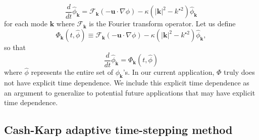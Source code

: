 \documentclass[12pt]{article}
\begin{document}
\begin{equation}
\label{eq:original_DE}
\frac{d}{d t} \hat{\phi}_{\mathbf{k}} = \mathcal{F}_{\mathbf{k}}(- \mathbf{u}\cdot\nabla \phi) - \kappa( |\mathbf{k}|^{2} - k^{\star 2})\hat{\phi}_{\mathbf{k}}
\end{equation}
for each mode $\mathbf{k}$ where  $\mathcal{F}_{\mathbf{k}}$ is the Fourier transform operator.  Let us define 
\begin{equation}
\Phi_{\mathbf{k}}(t,\hat{\phi})\equiv \mathcal{F}_{\mathbf{k}}(- \mathbf{u}\cdot\nabla \phi) - \kappa( |\mathbf{k}|^{2} - k^{\star 2})\hat{\phi}_{\mathbf{k}}, 
\end{equation}
so that 
\begin{equation}
\frac{d}{d t} \hat{\phi}_{\mathbf{k}}  = \Phi_{
\mathbf{k}}(t,\hat{\phi})
\end{equation}
where $\hat{\phi}$ represents the entire set of $\phi_{\mathbf{k}}$'s. In our current application, $\Phi$ truly does not have explicit time dependence. We include this explicit time dependence as an argument to generalize to potential future applications that may have explicit time dependence.


\subsection{Cash-Karp adaptive time-stepping method}
\end{document}
